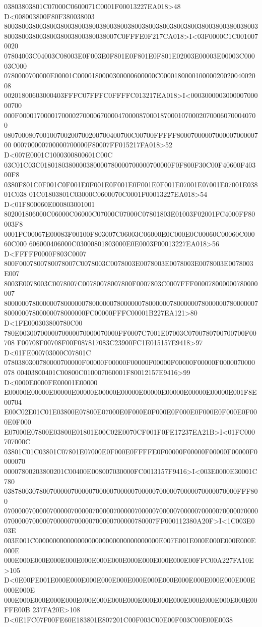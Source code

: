 03803803801C07000C0600071C0001F00013227EA018>48 D<008003800F80F380038003
800380038003800380038003800380038003800380038003800380038003800380038003
80038003800380038003800380038007C0FFFE0F217CA018>I<03F0000C1C0010070020
07804003C04003C08003E0F003E0F801E0F801E0F801E02003E00003E00003C00003C000
0780000700000E00001C0000180000300000600000C00001800001000002002004002008
00201800603000403FFFC07FFFC0FFFFC013217EA018>I<000300000300000700000700
000F00001700001700002700006700004700008700018700010700020700060700040700
080700080700100700200700200700400700C00700FFFFF8000700000700000700000700
000700000700000700000F80007FF015217FA018>52 D<007E0001C1000300800601C00C
03C01C03C0180180380000380000780000700000700000F0F800F30C00F40600F40300F8
0380F801C0F001C0F001E0F001E0F001E0F001E0F001E07001E07001E07001E03801C038
01C01803801C03000C0600070C0001F00013227EA018>54 D<01F800060E000803001001
802001806000C06000C06000C07000C07000C07801803E01003F02001FC4000FF80003F8
0001FC00067E00083F00100F803007C06003C06000E0C000E0C00060C00060C00060C000
606000406000C03000801803000E0E0003F00013227EA018>56 D<FFFFF0000F803C0007
800F0007800780078007C0078003C0078003E0078003E0078003E0078003E0078003E007
8003E0078003C0078007C00780078007800F0007803C0007FFF000078000000780000007
800000078000000780000007800000078000000780000007800000078000000780000007
80000007800000078000000FC00000FFFC00001B227EA121>80 D<1FE000303800780C00
780E0030070000070000070000070000FF0007C7001E07003C0700780700700700F00708
F00708F00708F00F087817083C23900FC1E015157E9418>97 D<01FE000703000C07801C
0780380300780000700000F00000F00000F00000F00000F00000F00000F0000070000078
00403800401C00800C010007060001F80012157E9416>99 D<0000E0000FE00001E00000
E00000E00000E00000E00000E00000E00000E00000E00000E00000E00000E001F8E00704
E00C02E01C01E03800E07800E07000E0F000E0F000E0F000E0F000E0F000E0F000E0F000
E07000E07800E03800E01801E00C02E0070CF001F0FE17237EA21B>I<01FC000707000C
03801C01C03801C07801E07000E0F000E0FFFFE0F00000F00000F00000F00000F0000070
00007800203800201C00400E008007030000FC0013157F9416>I<003E0000E30001C780
038780030780070000070000070000070000070000070000070000070000070000FFF800
070000070000070000070000070000070000070000070000070000070000070000070000
0700000700000700000700000700000700000780007FF000112380A20F>I<1C003E003E
003E001C00000000000000000000000000000000000E007E001E000E000E000E000E000E
000E000E000E000E000E000E000E000E000E000E000E000E00FFC00A227FA10E>105
D<0E00FE001E000E000E000E000E000E000E000E000E000E000E000E000E000E000E000E
000E000E000E000E000E000E000E000E000E000E000E000E000E000E000E000E00FFE00B
237FA20E>108 D<0E1FC07F00FE60E183801E807201C00F003C00E00F003C00E00E0038
